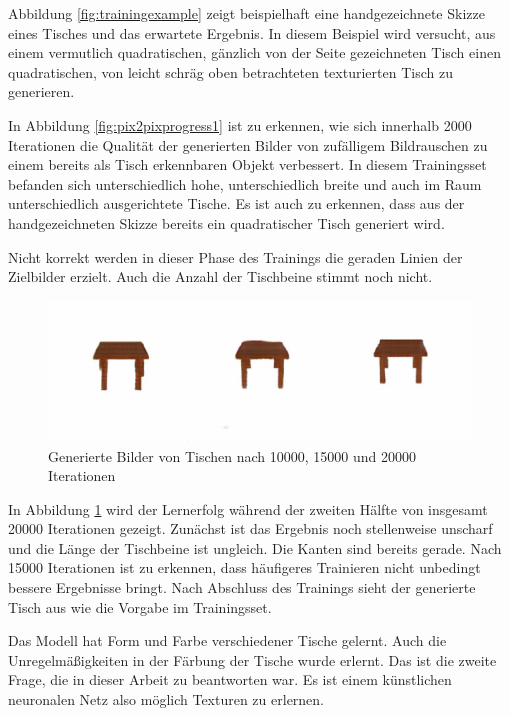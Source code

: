 Abbildung \ref{fig:trainingexample} zeigt beispielhaft eine handgezeichnete Skizze eines Tisches und das erwartete Ergebnis. In diesem Beispiel wird versucht, aus einem vermutlich quadratischen, gänzlich von der Seite gezeichneten Tisch einen quadratischen, von leicht schräg oben betrachteten texturierten Tisch zu generieren.

In Abbildung \ref{fig:pix2pixprogress1} ist zu erkennen, wie sich innerhalb 2000 Iterationen die Qualität der generierten Bilder von zufälligem Bildrauschen zu einem bereits als Tisch erkennbaren Objekt verbessert. In diesem Trainingsset befanden sich unterschiedlich hohe, unterschiedlich breite und auch im Raum unterschiedlich ausgerichtete Tische. Es ist auch zu erkennen, dass aus der handgezeichneten Skizze bereits ein quadratischer Tisch generiert wird.

Nicht korrekt werden in dieser Phase des Trainings die geraden Linien der Zielbilder erzielt. Auch die Anzahl der Tischbeine stimmt noch nicht.

\begin{figure}[h]
	\centering
	\includegraphics[width=1.0\textwidth]{bilder/pix2pix_progress/progress_tables2.png}
	\caption[Lernfortschritt am Beispiel von Tischen 2]{Generierte Bilder von Tischen nach 10000, 15000 und 20000 Iterationen}
	\label{fig:pix2pixprogress2}
\end{figure}

In Abbildung \ref{fig:pix2pixprogress2} wird der Lernerfolg während der zweiten Hälfte von insgesamt 20000 Iterationen gezeigt. Zunächst ist das Ergebnis noch stellenweise unscharf und die Länge der Tischbeine ist ungleich. Die Kanten sind bereits gerade. Nach 15000 Iterationen ist zu erkennen, dass häufigeres Trainieren nicht unbedingt bessere Ergebnisse bringt. Nach Abschluss des Trainings sieht der generierte Tisch aus wie die Vorgabe im Trainingsset.

Das Modell hat Form und Farbe verschiedener Tische gelernt. Auch die Unregelmäßigkeiten in der Färbung der Tische wurde erlernt. Das ist die zweite Frage, die in dieser Arbeit zu beantworten war. Es ist einem künstlichen neuronalen Netz also möglich Texturen zu erlernen.

